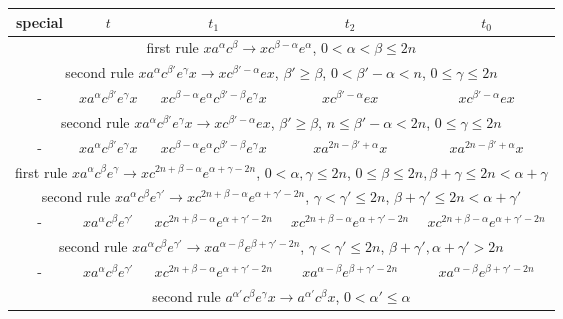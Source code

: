 \documentclass{article}
\theoremstyle{definition}
\begin{document}
\begin{center}
\begin{tabular}{|c|c|c|c|c|}
\hline
special & $t$ & $t_1$ & $t_2$ & $t_0$ \\
\hline
\hline
\multicolumn{5}{|c|}{first rule $x a^\alpha c^\beta \rightarrow x c^{\beta - \alpha} e^\alpha$, $0< \alpha <\beta \le 2n$}\\
\hline
\hline
\multicolumn{5}{|c|}{second rule $x a^\alpha c^{\beta'} e^\gamma x \rightarrow x c^{\beta'-\alpha} e x$, $\beta'\ge \beta$, $0<\beta'-\alpha<n$, $0 \le \gamma \le 2n$}\\
\hline
- &  $ x a^\alpha c^{\beta'}  e^\gamma x $ &  $ x  c^{\beta - \alpha} e^\alpha c^{\beta'-\beta} e^\gamma  x $ &  $   x c^{\beta'-\alpha} e   x  $ & $ x c^{\beta'-\alpha} e  x $\\
\hline
\multicolumn{5}{|c|}{second rule $x a^\alpha c^{\beta'} e^\gamma x \rightarrow x c^{\beta'-\alpha} e x$, $\beta'\ge \beta$, $n\le\beta'-\alpha<2n$, $0 \le \gamma \le 2n$}\\
\hline
- &  $ x a^\alpha c^{\beta'}  e^\gamma x $ &  $ x  c^{\beta - \alpha} e^\alpha c^{\beta'-\beta} e^\gamma  x $ &  $   x a^{2n-\beta'+\alpha} x  $ & $ x a^{2n-\beta'+\alpha} x $\\
\hline
\hline
\multicolumn{5}{|c|}{first rule $x a^\alpha c^\beta e^\gamma \rightarrow x c^{2n+\beta - \alpha} e^{\alpha+\gamma-2n}$, $0< \alpha,\gamma  \le 2n$, $0\le \beta\le 2n, \beta+\gamma \le 2n <\alpha+\gamma$}\\
\hline
\hline
\multicolumn{5}{|c|}{second rule $x a^\alpha c^\beta e^{\gamma'} \rightarrow x c^{2n+\beta - \alpha} e^{\alpha+\gamma'-2n}$, $\gamma<\gamma'\le 2n$, $\beta+\gamma' \le 2n <\alpha+\gamma'$}\\
\hline
- &  $ x a^\alpha c^{\beta}  e^{\gamma'} $ &  $ x c^{2n+\beta - \alpha} e^{\alpha+\gamma'-2n}  $ &  $   x c^{2n+\beta - \alpha} e^{\alpha+\gamma'-2n}   $ & $ x c^{2n+\beta - \alpha} e^{\alpha+\gamma'-2n}  $\\
\hline
\multicolumn{5}{|c|}{second rule $x a^\alpha c^\beta e^{\gamma'} \rightarrow x a^{\alpha-\beta} e^{\beta+\gamma'-2n}$, $\gamma<\gamma'\le2n$, $\beta+\gamma',\alpha+\gamma' > 2n$}\\
\hline
- &  $ x a^\alpha c^{\beta}  e^{\gamma'} $ &  $ x c^{2n+\beta - \alpha} e^{\alpha+\gamma'-2n}  $ &  $   x a^{\alpha-\beta} e^{\beta+\gamma'-2n}   $ & $ x a^{\alpha-\beta} e^{\beta+\gamma'-2n}  $\\
\hline
\multicolumn{5}{|c|}{second rule $a^{\alpha'} c^\beta e^\gamma x  \rightarrow a^{\alpha'} c^\beta x $, $0<\alpha' \le \alpha$}\\

\end{tabular}
\end{center}
\end{document}
